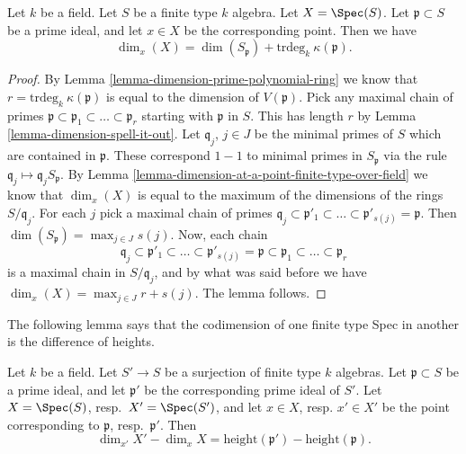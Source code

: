 \begin{lemma}
\label{lemma-dimension-at-a-point-finite-type-field}
Let $k$ be a field.
Let $S$ be a finite type $k$ algebra.
Let $X = \Spec(S)$.
Let $\mathfrak p \subset S$ be a prime ideal,
and let $x \in X$ be the corresponding point.
Then we have
$$
\dim_x(X) = \dim(S_{\mathfrak p}) + \text{trdeg}_k\ \kappa(\mathfrak p).
$$
\end{lemma}

\begin{proof}
By Lemma \ref{lemma-dimension-prime-polynomial-ring} we know that
$r = \text{trdeg}_k\ \kappa(\mathfrak p)$ is equal to the
dimension of $V(\mathfrak p)$.
Pick any maximal chain of primes
$\mathfrak p \subset \mathfrak p_1 \subset \ldots \subset \mathfrak p_r$
starting with $\mathfrak p$ in $S$.
This has length $r$ by Lemma \ref{lemma-dimension-spell-it-out}.
Let $\mathfrak q_j$, $j \in J$ be the minimal
primes of $S$ which are contained in $\mathfrak p$.
These correspond $1-1$ to minimal primes in $S_{\mathfrak p}$
via the rule $\mathfrak q_j \mapsto \mathfrak q_jS_{\mathfrak p}$.
By Lemma \ref{lemma-dimension-at-a-point-finite-type-over-field}
we know that $\dim_x(X)$ is equal
to the maximum of the dimensions of the rings $S/\mathfrak q_j$.
For each $j$ pick a maximal chain of primes
$\mathfrak q_j \subset \mathfrak p'_1 \subset \ldots \subset \mathfrak p'_{s(j)}
= \mathfrak p$.
Then $\dim(S_{\mathfrak p}) = \max_{j \in J} s(j)$.
Now, each chain
$$
\mathfrak q_j \subset \mathfrak p'_1 \subset \ldots \subset
\mathfrak p'_{s(j)} = \mathfrak p \subset
\mathfrak p_1 \subset \ldots \subset \mathfrak p_r
$$
is a maximal chain in $S/\mathfrak q_j$, and by what was said
before we have
$\dim_x(X) = \max_{j \in J} r + s(j)$.
The lemma follows.
\end{proof}

\noindent
The following lemma says that the codimension of one finite type
Spec in another is the difference of heights.

\begin{lemma}
\label{lemma-codimension}
Let $k$ be a field.
Let $S' \to S$ be a surjection of finite type $k$ algebras.
Let $\mathfrak p \subset S$ be a prime ideal,
and let $\mathfrak p'$ be the corresponding prime ideal of $S'$.
Let $X = \Spec(S)$, resp.\ $X' = \Spec(S')$,
and let $x \in X$, resp. $x'\in X'$ be the point corresponding
to $\mathfrak p$, resp.\ $\mathfrak p'$.
Then
$$
\dim_{x'} X' - \dim_x X =
\text{height}(\mathfrak p') - \text{height}(\mathfrak p).
$$
\end{lemma}

